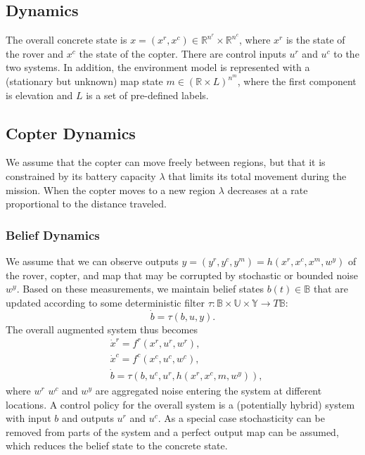 \documentclass[conference]{IEEEtran}
\begin{document}
\subsection{Dynamics}

The overall concrete state is $x = (x^r, x^c) \in \mathbb{R}^{n^r} \times \mathbb{R}^{n^c}$, where $x^r$ is the state of the rover and $x^c$ the state of the copter. There are control inputs $u^r$ and $u^c$ to the two systems. In addition, the environment model is represented with a (stationary but unknown) map state $m \in (\mathbb{R} \times L)^{n^m}$, where the first component is elevation and $L$ is a set of pre-defined labels.

\subsection{Copter Dynamics}

We assume that the copter can move freely between regions, but that it is constrained by its battery capacity $\lambda$ that limits its total movement during the mission. When the copter moves to a new region $\lambda$ decreases at a rate proportional to the distance traveled.

\subsubsection{Belief Dynamics}

We assume that we can observe outputs $y = (y^r, y^c, y^m) = h(x^r, x^c, x^m, w^y)$ of the rover, copter, and map that may be corrupted by stochastic or bounded noise $w^y$. Based on these measurements, we maintain belief states $b(t) \in \mathbb{B}$ that are updated according to some deterministic filter $\tau : \mathbb{B} \times \mathbb{U} \times \mathbb{Y} \rightarrow T \mathbb{B}$:
\begin{equation}
  \dot b = \tau(b, u, y).
\end{equation} 
The overall augmented system thus becomes
\begin{equation}
\label{eq:belief}
\begin{aligned}
  & \dot x^r = f^r(x^r, u^r, w^r), \\
  & \dot x^c = f^c(x^c, u^c, w^c), \\
  & \dot b = \tau(b, u^c, u^r, h(x^r, x^c, m, w^y)),
\end{aligned}
\end{equation}
where $w^r$ $w^c$ and $w^y$ are aggregated noise entering the system at different locations. A control policy for the overall system is a (potentially hybrid) system with input $b$ and outputs $u^r$ and $u^c$. As a special case stochasticity can be removed from parts of the system and a perfect output map can be assumed, which reduces the belief state to the concrete state. 
\end{document}
